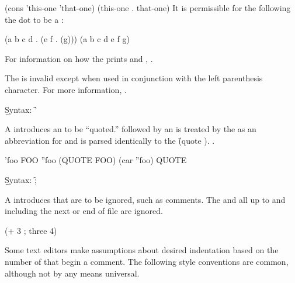\code
 (cons 'this-one 'that-one) \EV (this-one . that-one)
\endcode
It is permissible for the  
following the dot to be a :

\code
 (a b c d . (e f . (g))) \EQ (a b c d e f g)
\endcode

For information on how the  prints  and ,
\seesection\PrintingListsAndConses.

\endsubsection%



The  is invalid 
except when used in conjunction with the left parenthesis character.
For more information, \seesection\ReaderAlgorithm.

\endsubsection%


\b{Syntax:}  \f{'}


A  introduces an  to be ``quoted.''
 followed by an   
is treated by the  as an abbreviation for
and is parsed identically to the  \f{(quote )}.
.


\code
 'foo \EV FOO
 ''foo \EV (QUOTE FOO)
 (car ''foo) \EV QUOTE
\endcode

\endsubsubsection%

\endsubsection%


\b{Syntax:} \f{;}


A  introduces  that are to be ignored,
such as comments.  The  and all  up to
and including the next  or end of file are ignored.


\code
 (+ 3 ; three
    4)
\endcode


Some text editors make assumptions about desired indentation based on
the number of  that begin a comment.  The following style 
conventions are common, although not by any means universal.  


